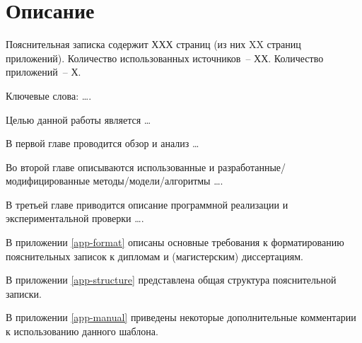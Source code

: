 \chapter*{Описание}
\thispagestyle{plain}

Пояснительная записка содержит ХХХ  страниц (из них XX страниц приложений).   Количество использованных источников~-- ХХ. Количество приложений~-- Х.

Ключевые слова: \dots .

Целью данной работы является \dots

В первой главе проводится обзор и анализ \dots 

Во второй главе описываются использованные и разработанные/модифицированные методы/модели/алгоритмы \dots. 

В третьей главе приводится описание программной реализации и экспериментальной проверки \dots.

В приложении \ref{app-format} описаны основные требования к форматированию пояснительных записок к дипломам и (магистерским) диссертациям.

В приложении \ref{app-structure} представлена общая структура пояснительной записки.

В приложении \ref{app-manual} приведены некоторые дополнительные комментарии к использованию данного шаблона.